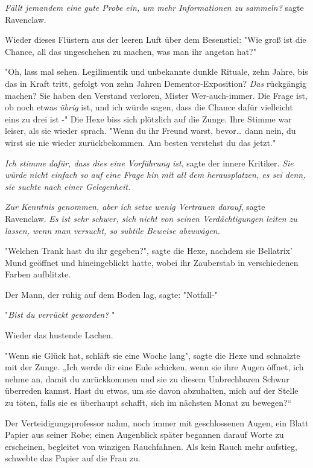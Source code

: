 {\emph{Fällt jemandem eine gute Probe ein, um mehr Informationen zu sammeln?} sagte Ravenclaw.

Wieder dieses Flüstern aus der leeren Luft über dem Besenstiel: "Wie groß ist die Chance, all das ungeschehen zu machen, was man ihr angetan hat?"

"Oh, lass mal sehen. Legilimentik und unbekannte dunkle Rituale, zehn Jahre, bis das in Kraft tritt, gefolgt von zehn Jahren Dementor-Exposition? \emph{Das} rückgängig machen? Sie haben den Verstand verloren, Mister Wer-auch-immer. Die Frage ist, ob noch etwas \emph{übrig} ist, und ich würde sagen, dass die Chance dafür vielleicht eins zu drei ist -" Die Hexe biss sich plötzlich auf die Zunge. Ihre Stimme war leiser, als sie wieder sprach. "Wenn du ihr Freund warst, bevor… dann nein, du wirst sie nie wieder zurückbekommen. Am besten verstehst du das jetzt."

\emph{Ich stimme dafür, dass dies eine Vorführung ist}, sagte der innere Kritiker. \emph{Sie würde nicht einfach so auf eine Frage hin mit all dem herausplatzen, es sei denn, sie suchte nach einer Gelegenheit.}

\emph{Zur Kenntnis genommen, aber ich setze wenig Vertrauen darauf}, sagte Ravenclaw. \emph{Es ist sehr schwer, sich nicht von seinen Verdächtigungen leiten zu lassen, wenn man versucht, so subtile Beweise abzuwägen.}

"Welchen Trank hast du ihr gegeben?", sagte die Hexe, nachdem sie Bellatrix' Mund geöffnet und hineingeblickt hatte, wobei ihr Zauberstab in verschiedenen Farben aufblitzte.

Der Mann, der ruhig auf dem Boden lag, sagte: "Notfall-"

"\emph{Bist du verrückt geworden?} "

Wieder das hustende Lachen.

"Wenn sie Glück hat, schläft sie eine Woche lang", sagte die Hexe und schnalzte mit der Zunge. „Ich werde dir eine Eule schicken, wenn sie ihre Augen öffnet, ich nehme an, damit du zurückkommen und sie zu diesem Unbrechbaren Schwur überreden kannst. Hast du etwas, um sie davon abzuhalten, mich auf der Stelle zu töten, falls sie es überhaupt schafft, sich im nächsten Monat zu bewegen?“

Der Verteidigungsprofessor nahm, noch immer mit geschlossenen Augen, ein Blatt Papier aus seiner Robe; einen Augenblick später begannen darauf Worte zu erscheinen, begleitet von winzigen Rauchfahnen. Als kein Rauch mehr aufstieg, schwebte das Papier auf die Frau zu.

}

